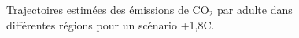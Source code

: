 \documentclass[a5paper,french,openany]{memoir}
\begin{document}
\begin{figure}[h!]
  \caption[Trajectoires d'émissions par région]{Trajectoires estimées des émissions de CO$_\text{2}$ par adulte dans différentes régions pour un scénario +1,8\textdegree{}C.}\label{fig:emissions_par_region}
\end{figure} 
\end{document}
